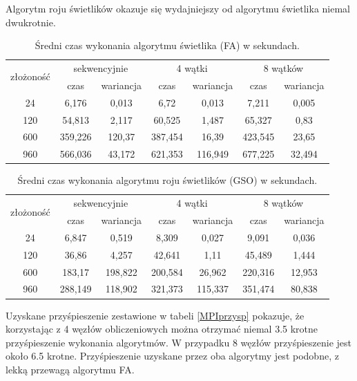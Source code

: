 \documentclass[11pt,a4paper,twoside]{article}
\begin{document}
Algorytm roju świetlików okazuje się wydajniejszy od algorytmu świetlika niemal dwukrotnie. 

\bgroup
\def\arraystretch{1.1}
\begin{table}[ht]
\caption{Średni czas wykonania algorytmu świetlika (FA) w sekundach.}
\label{MPIwspólnaFA}
\centering
\begin{tabular}{|c||c|c||c|c||c|c|}
\hline
 \multirow{2}{*}{złożoność} & \multicolumn{2}{c||}{sekwencyjnie} & \multicolumn{2}{c||}{4 wątki} & \multicolumn{2}{c|}{8 wątków} \\\cline{2-7}
 & czas & wariancja & czas & wariancja & czas & wariancja \\\hline
 24 & 6,176 & 0,013 & 6,72 & 0,013 & 7,211 & 0,005\\\hline
 120 & 54,813 & 2,117 & 60,525 & 1,487 & 65,327 & 0,83 \\\hline
 600 & 359,226 & 120,37 & 387,454 & 16,39 & 423,545 & 23,65 \\\hline
 960 & 566,036 & 43,172 & 621,353 & 116,949 & 677,225 & 32,494\\\hline
\end{tabular}
\end{table}
\egroup

\bgroup
\def\arraystretch{1.1}
\begin{table}[ht]
\caption{Średni czas wykonania algorytmu roju świetlików (GSO) w sekundach.}
\label{MPIwspólnaGSO}
\centering
\begin{tabular}{|c||c|c||c|c||c|c|}
\hline
 \multirow{2}{*}{złożoność} & \multicolumn{2}{c||}{sekwencyjnie} & \multicolumn{2}{c||}{4 wątki} & \multicolumn{2}{c|}{8 wątków} \\\cline{2-7}
 & czas & wariancja & czas & wariancja & czas & wariancja \\\hline
 24 & 6,847 & 0,519 & 8,309 & 0,027 & 9,091 & 0,036 \\\hline
 120 & 36,86 & 4,257 & 42,641 & 1,11 & 45,489 & 1,444 \\\hline
 600 & 183,17 & 198,822 & 200,584 & 26,962 & 220,316 & 12,953 \\\hline
 960 & 288,149 & 118,902 & 321,373 & 115,337 & 351,474 & 80,838\\\hline
\end{tabular}
\end{table}
\egroup

Uzyskane przyśpieszenie zestawione w tabeli \ref{MPIprzysp} pokazuje, że korzystając z 4 węzłów obliczeniowych można otrzymać niemal 3.5 krotne przyśpieszenie wykonania algorytmów. W przypadku 8 węzłów przyśpieszenie jest około 6.5 krotne. Przyśpieszenie uzyskane przez oba algorytmy jest podobne, z lekką przewagą algorytmu FA.
\end{document}

